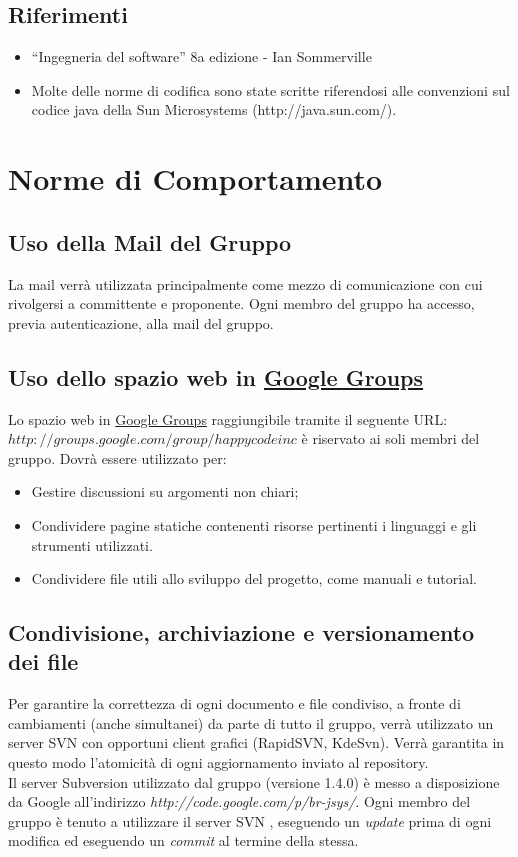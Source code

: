 \section{Riferimenti}
\begin{itemize}
\item ``Ingegneria del software'' 8a edizione - Ian Sommerville 
\item Molte delle norme di codifica sono state scritte riferendosi alle convenzioni sul codice java della Sun Microsystems (http://java.sun.com/).
\end{itemize}

\chapter{Norme di Comportamento}
\section{Uso della Mail del Gruppo}
La mail verr\`a utilizzata principalmente come mezzo di comunicazione con cui rivolgersi a committente e proponente. Ogni membro del gruppo ha accesso, previa autenticazione, alla mail del gruppo.
\section{Uso dello spazio web in \underline{Google Groups}}
Lo spazio web in \underline{Google Groups} raggiungibile tramite il seguente URL: \({http://groups.google.com/group/happycodeinc}\) \`e riservato ai soli membri del gruppo. Dovr\`a essere utilizzato per:
\begin{itemize}
\item  Gestire discussioni su argomenti non chiari;
\item Condividere pagine statiche contenenti risorse pertinenti i linguaggi e gli strumenti utilizzati.
\item Condividere file utili allo sviluppo del progetto, come manuali e tutorial.
\end{itemize}

\section[Condivisione dei file]{Condivisione, archiviazione e versionamento dei file}
Per garantire la correttezza di ogni documento e file condiviso, a fronte di cambiamenti (anche simultanei) da parte di tutto il gruppo, verr\`a  utilizzato un server SVN con opportuni client grafici (RapidSVN, KdeSvn). Verr\`a garantita in questo modo l'atomicit\`a di ogni aggiornamento inviato al repository.\\ 
Il server Subversion utilizzato dal gruppo (versione 1.4.0) \`e messo a disposizione da Google all'indirizzo \textit{http://code.google.com/p/br-jsys/}.
\newline
 \newline
Ogni membro del gruppo \`e tenuto a utilizzare il server SVN , eseguendo un \textit{update} prima di ogni modifica ed eseguendo un \textit{commit} al termine della stessa.

